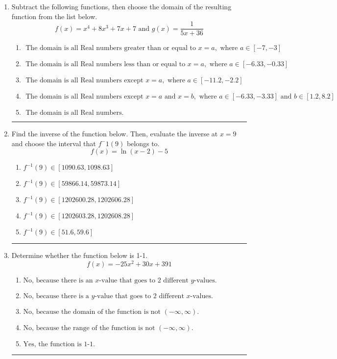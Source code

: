 \documentclass[14pt]{extbook}
\newcommand{\litem}[1]{\item#1\hspace*{-1cm}\rule{\textwidth}{0.4pt}}
\begin{document}
\begin{enumerate}
\litem{
Subtract the following functions, then choose the domain of the resulting function from the list below.\[ f(x) = x^{4} +8 x^{3} +7 x + 7 \text{ and } g(x) = \frac{1}{5x+36} \]\begin{enumerate}[label=\Alph*.]
\item \( \text{ The domain is all Real numbers greater than or equal to } x = a, \text{ where } a \in [-7, -3] \)
\item \( \text{ The domain is all Real numbers less than or equal to } x = a, \text{ where } a \in [-6.33, -0.33] \)
\item \( \text{ The domain is all Real numbers except } x = a, \text{ where } a \in [-11.2, -2.2] \)
\item \( \text{ The domain is all Real numbers except } x = a \text{ and } x = b, \text{ where } a \in [-6.33, -3.33] \text{ and } b \in [1.2, 8.2] \)
\item \( \text{ The domain is all Real numbers. } \)

\end{enumerate} }
\litem{
Find the inverse of the function below. Then, evaluate the inverse at $x = 9$ and choose the interval that $f^-1(9)$ belongs to.\[ f(x) = \ln{(x-2)}-5 \]\begin{enumerate}[label=\Alph*.]
\item \( f^{-1}(9) \in [1090.63, 1098.63] \)
\item \( f^{-1}(9) \in [59866.14, 59873.14] \)
\item \( f^{-1}(9) \in [1202600.28, 1202606.28] \)
\item \( f^{-1}(9) \in [1202603.28, 1202608.28] \)
\item \( f^{-1}(9) \in [51.6, 59.6] \)

\end{enumerate} }
\litem{
Determine whether the function below is 1-1.\[ f(x) = -25 x^2 + 30 x + 391 \]\begin{enumerate}[label=\Alph*.]
\item \( \text{No, because there is an $x$-value that goes to 2 different $y$-values.} \)
\item \( \text{No, because there is a $y$-value that goes to 2 different $x$-values.} \)
\item \( \text{No, because the domain of the function is not $(-\infty, \infty)$.} \)
\item \( \text{No, because the range of the function is not $(-\infty, \infty)$.} \)
\item \( \text{Yes, the function is 1-1.} \)


\end{enumerate}}
\end{enumerate}
\end{document}
